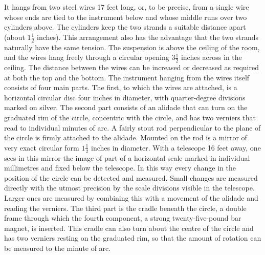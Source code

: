 It hangs from two steel wires 17 feet long, or, to be precise, from a single wire whose ends are tied to the instrument below and whose middle runs over two cylinders above. The cylinders keep the two strands a suitable distance apart (about $1\frac{1}{2}$ inches). This arrangement also has the advantage that the two strands naturally have the same tension. The suspension is above the ceiling of the room, and the wires hang freely through a circular opening $3\frac{1}{2}$ inches across in the ceiling. The distance between the wires can be increased or decreased as required at both the top and the bottom. The instrument hanging from the wires itself consists of four main parts. The first, to which the wires are attached, is a horizontal circular disc four inches in diameter, with quarter-degree divisions marked on silver. The second part consists of an alidade that can turn on the graduated rim of the circle, concentric with the circle, and has two verniers that read to individual minutes of arc. A fairly stout rod perpendicular to the plane of the circle is firmly attached to the alidade. Mounted on the rod is a mirror of very exact circular form $1\frac{1}{2}$ inches in diameter. With a telescope 16 feet away, one sees in this mirror the image of part of a horizontal scale marked in individual millimetres and fixed below the telescope. In this way every change in the position of the circle can be detected and measured. Small changes are measured directly with the utmost precision by the scale divisions visible in the telescope. Larger ones are measured by combining this with a movement of the alidade and reading the verniers. The third part is the cradle beneath the circle, a double frame through which the fourth component, a strong twenty-five-pound bar magnet, is inserted. This cradle can also turn about the centre of the circle and has two verniers resting on the graduated rim, so that the amount of rotation can be measured to the minute of arc.

